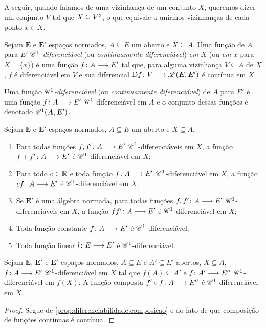 A seguir, quando falamos de uma vizinhança de um conjunto $X$, queremos dizer um conjunto $V$ tal que $X \subseteq {V}^\circ$, o que equivale a unirmos vizinhanças de cada ponto $x \in X$.

\begin{definition}
Sejam $\bm E$ e $\bm E'$ espaços normados, $A \subseteq E$ um aberto e $X \subseteq A$. Uma função de $A$ para $E'$ \emph{$\mathscr{C}^1$-diferenciável} (ou \emph{continuamente diferenciável}) \emph{em $X$} (ou \emph{em $x$} para $X = \{x\}$) é uma função $f\colon \allowbreak A \longrightarrow E'$ tal que, para alguma vizinhança $V \subseteq A$ de $X$, $f$ é diferenciável em $V$ e sua diferencial $\mathrm{D} f\colon \allowbreak V \longrightarrow \mathscr{L}(\bm E, \bm E')$ é contínua em $X$.

Uma função \emph{$\mathscr{C}^1$-diferenciável} (ou \emph{continuamente diferenciável}) de $A$ para $E'$ é uma função $f\colon \allowbreak A \longrightarrow E'$ $\mathscr{C}^1$-diferenciável em $A$ e o conjunto dessas funções é denotado $\mathscr{C}^1(\bm A,\bm E')$.
\end{definition}


\begin{exercise}
\label{prop:diferencial.continua.propriedades}
Sejam $\bm E$ e $\bm E'$ espaços normados, $A \subseteq E$ um aberto e $X \subseteq A$.
	\begin{enumerate}
	\item Para todas funções $f,f'\colon \allowbreak A \longrightarrow E'$ $\mathscr{C}^1$-diferenciáveis em $X$, a função $f+f'\colon \allowbreak A \longrightarrow E'$ é $\mathscr{C}^1$-diferenciável em $X$;
	\item Para todo $c \in \mathbb{R}$ e toda função $f\colon \allowbreak A \longrightarrow E'$ $\mathscr{C}^1$-diferenciável em $X$, a função $c f\colon \allowbreak A \longrightarrow E'$ é $\mathscr{C}^1$-diferenciável em $X$;
	\item Se $\bm E'$ é uma álgebra normada, para todas funções $f,f'\colon \allowbreak A \longrightarrow E'$ $\mathscr{C}^1$-diferenciáveis em $X$, a função $f f'\colon \allowbreak A \longrightarrow E'$ é $\mathscr{C}^1$-diferenciável em $X$;
	\item Toda função constante $f\colon \allowbreak A \longrightarrow E'$ é $\mathscr{C}^1$-diferenciável;
	\item Toda função linear $l\colon \allowbreak E \longrightarrow E'$ é $\mathscr{C}^1$-diferenciável.
	\end{enumerate}
\end{exercise}

\begin{proposition}
\label{prop:diferenciabilidade.continua.composicao}
Sejam $\bm E$, $\bm E'$ e $\bm E'$ espaços normados, $A \subseteq E$ e $A' \subseteq E'$ abertos, $X \subseteq A$, $f\colon \allowbreak A \longrightarrow E'$ $\mathscr{C}^1$-diferenciável em $X$ tal que $f(A) \subseteq A'$ e $f\colon \allowbreak A' \longrightarrow E''$ $\mathscr{C}^1$-diferenciável em $f(X)$. A função composta $f' \circ f\colon \allowbreak A \longrightarrow E''$ é $\mathscr{C}^1$-diferenciável em $X$.
\end{proposition}
\begin{proof}
Segue de \ref{prop:diferenciabilidade.composicao} e do fato de que composição de funções contínuas é contínua.
\end{proof}

